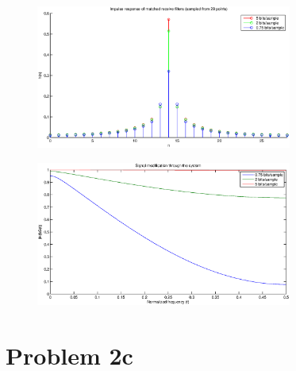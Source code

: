 	\begin{figure}[H]
	  \centering
	  \includegraphics[width=0.75\textwidth]{img/Oppgave2b_impulse_H_diskrete_t}
	\end{figure}
	
	\begin{figure}[H]
	  \centering
	  \includegraphics[width=0.75\textwidth]{img/Oppgave2b_signal_mod_x_y}
	\end{figure}

\section{Problem 2c}
